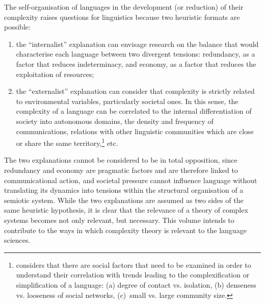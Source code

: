 \documentclass[output=paper]{langscibook}
\begin{document}
The self-organisation of languages in the development (or reduction) of their complexity raises questions for linguistics because two heuristic formats are possible: 

\begin{enumerate}
\item the “internalist” explanation can envisage research on the balance that would characterise each language between two divergent tensions: redundancy, as a factor that reduces indeterminacy, and economy, as a factor that reduces the exploitation of resources;
\item the “externalist” explanation can consider that complexity is strictly related to environmental variables, particularly societal ones. In this sense, the complexity of a language can be correlated to the internal differentiation of society into autonomous domains, the density and frequency of communications, relations with other linguistic communities which are close or share the same territory,\footnote{\citet[98]{Trudgill2009} considers that there are social factors that need to be examined in order to understand their correlation with trends leading to the complexification or simplification of a language: (a) degree of contact vs. isolation, (b) denseness vs. looseness of social networks, (c)~small vs. large community size.} etc.
\end{enumerate}

The two explanations cannot be considered to be in total opposition, since redundancy and economy are pragmatic factors and are therefore linked to communicational action, and societal pressure cannot influence language without translating its dynamics into tensions within the structural organisation of a semiotic system. While the two explanations are assumed as two sides of the same heuristic hypothesis, it is clear that the relevance of a theory of complex systems becomes not only relevant, but necessary. This volume intends to contribute to the ways in which complexity theory is relevant to the language sciences. 
\end{document}
